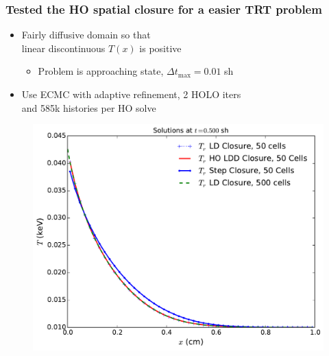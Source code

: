 \documentclass[xcolor=dvipsnames,hyperref={pdfpagelabels=false},unknownkeysallowed]{beamer}
\newcommand{\colG}[1]{{\color{Gray!110} #1}}
\newlength{\wideitemsep}
\let\olditem\item
\renewcommand{\item}{\setlength{\itemsep}{\wideitemsep}\olditem}
\begin{document}
\begin{frame}
    \frametitle{Tested the HO spatial closure for a easier TRT problem}
    \begin{itemize}
        \item Fairly diffusive domain so that \\ linear discontinuous $T(x)$ is positive
            \begin{itemize}
                \item[]\colG{ Problem is approaching state, $\Delta t_{\max} = 0.01$ sh}
            \end{itemize}
        \item Use ECMC with adaptive refinement, 2 HOLO iters \\ \colG{and 585k
            histories per HO solve}
    \end{itemize}
\begin{figure}[H]
    \centering
    \includegraphics[width=0.65\linewidth]{smooth_compare.pdf}
\end{figure}
\end{frame}
\end{document}
